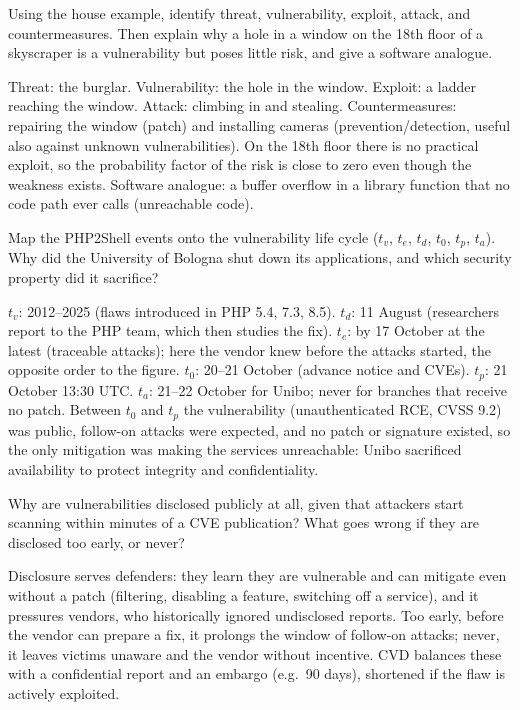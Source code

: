 \begin{exercise}
Using the house example, identify threat, vulnerability, exploit, attack, and countermeasures. Then explain why a hole in a window on the 18th floor of a skyscraper is a vulnerability but poses little risk, and give a software analogue.
\end{exercise}
\begin{solution}
Threat: the burglar. Vulnerability: the hole in the window. Exploit: a ladder reaching the window. Attack: climbing in and stealing. Countermeasures: repairing the window (patch) and installing cameras (prevention/detection, useful also against unknown vulnerabilities). On the 18th floor there is no practical exploit, so the probability factor of the risk is close to zero even though the weakness exists. Software analogue: a buffer overflow in a library function that no code path ever calls (unreachable code).
\end{solution}

\begin{exercise}
Map the PHP2Shell events onto the vulnerability life cycle ($t_v$, $t_e$, $t_d$, $t_0$, $t_p$, $t_a$). Why did the University of Bologna shut down its applications, and which security property did it sacrifice?
\end{exercise}
\begin{solution}
$t_v$: 2012--2025 (flaws introduced in PHP 5.4, 7.3, 8.5). $t_d$: 11 August (researchers report to the PHP team, which then studies the fix). $t_e$: by 17 October at the latest (traceable attacks); here the vendor knew before the attacks started, the opposite order to the figure. $t_0$: 20--21 October (advance notice and CVEs). $t_p$: 21 October 13:30 UTC. $t_a$: 21--22 October for Unibo; never for branches that receive no patch. Between $t_0$ and $t_p$ the vulnerability (unauthenticated RCE, CVSS 9.2) was public, follow-on attacks were expected, and no patch or signature existed, so the only mitigation was making the services unreachable: Unibo sacrificed availability to protect integrity and confidentiality.
\end{solution}

\begin{exercise}
Why are vulnerabilities disclosed publicly at all, given that attackers start scanning within minutes of a CVE publication? What goes wrong if they are disclosed too early, or never?
\end{exercise}
\begin{solution}
Disclosure serves defenders: they learn they are vulnerable and can mitigate even without a patch (filtering, disabling a feature, switching off a service), and it pressures vendors, who historically ignored undisclosed reports. Too early, before the vendor can prepare a fix, it prolongs the window of follow-on attacks; never, it leaves victims unaware and the vendor without incentive. CVD balances these with a confidential report and an embargo (e.g.\ 90 days), shortened if the flaw is actively exploited.
\end{solution}

